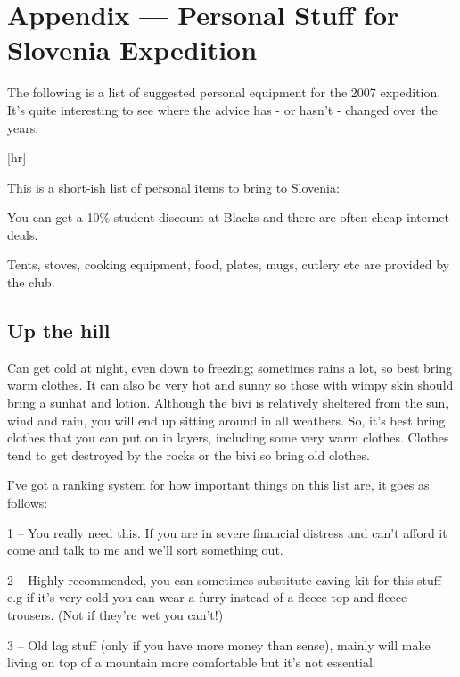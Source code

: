 \section{Appendix --- Personal Stuff for Slovenia Expedition}

The following is a list of suggested personal equipment for the 2007 expedition. It's quite interesting to see where the advice has - or hasn't - changed over the years.

[hr]


This is a short-ish list of personal items to bring to Slovenia:

You can get a 10\% student discount at Blacks and there are often cheap internet deals.

Tents, stoves, cooking equipment, food, plates, mugs, cutlery etc are provided by the club.


\subsection{Up the hill}
Can get cold at night, even down to freezing; sometimes rains a lot, so best bring warm clothes. It can also be very hot and sunny so those with wimpy skin should bring a sunhat and lotion. Although the bivi is relatively sheltered from the sun, wind and rain, you will end up sitting around in all weathers. So, it’s best bring clothes that you can put on in layers, including some very warm clothes. Clothes tend to get destroyed by the rocks or the bivi so bring old clothes.


I’ve got a ranking system for how important things on this list are, it goes as follows:

1 – You really need this. If you are in severe financial distress and can’t afford it come and talk to me and we’ll sort something out.

2 – Highly recommended, you can sometimes substitute caving kit for this stuff e.g if it’s very cold you can wear a furry instead of a fleece top and fleece trousers. (Not if they're wet you can't!)

3 – Old lag stuff (only if you have more money than sense), mainly will make living on top of a mountain more comfortable but it’s not essential.

